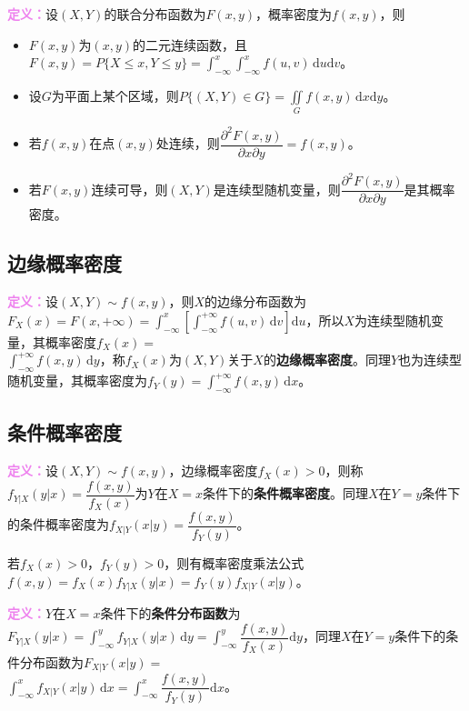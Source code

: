 \documentclass[UTF8, 12pt]{ctexart}
\begin{document}
\textcolor{violet}{\textbf{定义：}}设$(X,Y)$的联合分布函数为$F(x,y)$，概率密度为$f(x,y)$，则

\begin{itemize}
    \item $F(x,y)$为$(x,y)$的二元连续函数，且$F(x,y)=P\{X\leqslant x,Y\leqslant y\}=\int_{-\infty}^x\int_{-\infty}^xf(u,v)\,\textrm{d}u\textrm{d}v$。
    \item 设$G$为平面上某个区域，则$P\{(X,Y)\in G\}=\iint\limits_Gf(x,y)\,\textrm{d}x\textrm{d}y$。
    \item 若$f(x,y)$在点$(x,y)$处连续，则$\dfrac{\partial^2F(x,y)}{\partial x\partial y}=f(x,y)$。
    \item 若$F(x,y)$连续可导，则$(X,Y)$是连续型随机变量，则$\dfrac{\partial^2F(x,y)}{\partial x\partial y}$是其概率密度。
\end{itemize}

\subsection{边缘概率密度}

\textcolor{violet}{\textbf{定义：}}设$(X,Y)\sim f(x,y)$，则$X$的边缘分布函数为$F_X(x)=F(x,+\infty)=\int_{-\infty}^x\left[\int_{-\infty}^{+\infty}f(u,v)\,\textrm{d}v\right]\textrm{d}u$，所以$X$为连续型随机变量，其概率密度$f_X(x)=$\\$\int_{-\infty}^{+\infty}f(x,y)\,\textrm{d}y$，称$f_X(x)$为$(X,Y)$关于$X$的\textbf{边缘概率密度}。同理$Y$也为连续型随机变量，其概率密度为$f_Y(y)=\int_{-\infty}^{+\infty}f(x,y)\,\textrm{d}x$。

\subsection{条件概率密度}

\textcolor{violet}{\textbf{定义：}}设$(X,Y)\sim f(x,y)$，边缘概率密度$f_X(x)>0$，则称$f_{Y|X}(y|x)=\dfrac{f(x,y)}{f_X(x)}$为$Y$在$X=x$条件下的\textbf{条件概率密度}。同理$X$在$Y=y$条件下的条件概率密度为$f_{X|Y}(x|y)=\dfrac{f(x,y)}{f_Y(y)}$。

若$f_X(x)>0$，$f_Y(y)>0$，则有概率密度乘法公式$f(x,y)=f_X(x)f_{Y|X}(y|x)=f_Y(y)f_{X|Y}(x|y)$。

\textcolor{violet}{\textbf{定义：}}$Y$在$X=x$条件下的\textbf{条件分布函数}为$F_{Y|X}(y|x)=\int_{-\infty}^yf_{Y|X}(y|x)\,\textrm{d}y=\displaystyle{\int_{-\infty}^y\dfrac{f(x,y)}{f_X(x)}\textrm{d}y}$，同理$X$在$Y=y$条件下的条件分布函数为$F_{X|Y}(x|y)=$\\$\int_{-\infty}^xf_{X|Y}(x|y)\,\textrm{d}x=\displaystyle{\int_{-\infty}^x\dfrac{f(x,y)}{f_Y(y)}}\textrm{d}x$。
\end{document}
